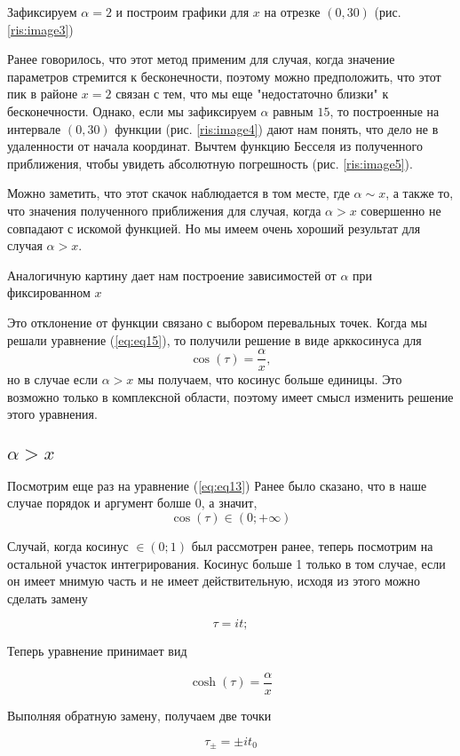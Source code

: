 \documentclass[14pt]{extarticle}
\begin{document}
Зафиксируем $\alpha=2$ и построим графики для $x$ на отрезке $(0, 30)$ (рис. \ref{ris:image3})



Ранее говорилось, что этот метод применим для случая, когда значение параметров стремится к бесконечности, поэтому можно предположить, что этот пик в районе $x = 2$ связан с тем, что мы еще "недостаточно близки" к бесконечности. Однако, если мы зафиксируем $\alpha$ равным $15$, то построенные на интервале $(0,30)$ функции (рис. \ref{ris:image4}) дают нам понять, что дело не в удаленности от начала координат. Вычтем функцию Бесселя из полученного приближения, чтобы увидеть абсолютную погрешность (рис. \ref{ris:image5}).

Можно заметить, что этот скачок наблюдается в том месте, где $\alpha \sim x$, а также то, что значения полученного приближения для случая, когда $\alpha > x$ совершенно не совпадают с искомой функцией. Но мы имеем очень хороший результат для случая $\alpha > x$.

Аналогичную картину дает нам построение зависимостей от $\alpha$ при фиксированном $x$

Это отклонение от функции связано с выбором перевальных точек. Когда мы решали уравнение (\ref{eq:eq15}), то получили решение в виде арккосинуса для
$$
\cos(\tau)=\frac{\alpha}{x},
$$
но в случае если $\alpha>x$ мы получаем, что косинус больше единицы. Это возможно только в комплексной области, поэтому имеет смысл изменить решение этого уравнения.\cite{Wong}

\subsection{$\alpha>x$}

Посмотрим еще раз на уравнение (\ref{eq:eq13})
Ранее было сказано, что в наше случае порядок и аргумент болше 0, а значит, 
$$
\cos(\tau) \in (0;+\infty)
$$

Случай, когда косинус $\in (0; 1)$ был рассмотрен ранее, теперь посмотрим на остальной участок интегрирования.
Косинус больше 1 только в том случае, если он имеет мнимую часть и не имеет действительную, исходя из этого можно сделать замену

$$
\tau = i t;
$$

Теперь уравнение принимает вид

$$
\cosh (\tau) = \frac{\alpha}{x}
$$

Выполняя обратную замену, получаем две точки 

$$
\tau_{\pm} = \pm i t_0
$$
\end{document}

